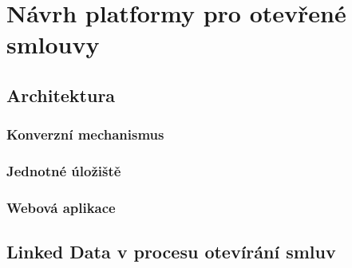 \chapter{Návrh platformy pro otevřené smlouvy}

\section{Architektura}

\subsection{Konverzní mechanismus}

\subsection{Jednotné úložiště}

\subsection{Webová aplikace}

\section{Linked Data v procesu otevírání smluv}